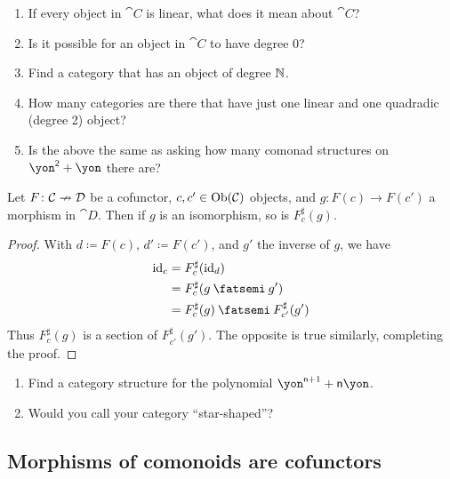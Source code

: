 \documentclass[DynamicalBook]{subfiles}
\begin{document}
\begin{exercise}
\begin{enumerate}
	\item If every object in $\cat{C}$ is linear, what does it mean about $\cat{C}$?
	\item Is it possible for an object in $\cat{C}$ to have degree $0$?
	\item Find a category that has an object of degree $\mathbb{N}$.
	\item How many categories are there that have just one linear and one quadradic (degree 2) object?
	\item Is the above the same as asking how many comonad structures on $\yon^\2+\yon$ there are?
\end{enumerate}
\end{exercise}

\begin{proposition}\label{prop.cofunctors_isos}
Let $F\colon\mathcal{C}\nrightarrow\mathcal{D}$ be a cofunctor, $c,c'\in\operatorname{Ob}(\mathcal{C})$ objects, and $g\colon F(c)\to F(c')$ a morphism in $\cat{D}$. Then if $g$ is an isomorphism, so is $F^\sharp_{c}(g)$.
\end{proposition}
\begin{proof}
With $d\coloneqq F(c)$, $d'\coloneqq F(c')$, and $g'$ the inverse of $g$, we have
\begin{align*}
	\id_c&=
	F^\sharp_c(\id_d)\\&=
	F^\sharp_c(g\then g')\\&=
	F^\sharp_c(g)\then F^\sharp_{c'}(g')
\end{align*}
Thus $F^\sharp_{c}(g)$ is a section of $F^\sharp_{c'}(g')$. The opposite is true similarly, completing the proof.
\end{proof}

\begin{exercise}\label{ex.star_shaped}
\begin{enumerate}
	\item Find a category structure for the polynomial $\yon^{\ord{n}+1}+\ord{n}\yon$.
	\item Would you call your category ``star-shaped''?
\qedhere
\end{enumerate}
\end{exercise}


\subsection{Morphisms of comonoids are cofunctors}
\end{document}
